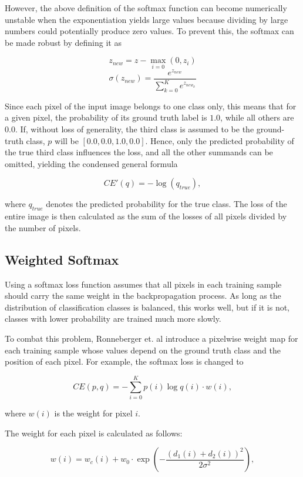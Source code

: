 However, the above definition of the softmax function can become numerically unstable when the exponentiation yields large values because dividing by large numbers could potentially produce zero values. To prevent this, the softmax can be made robust by defining it as

\[z_{new} = z - \max \limits_{i = 0}(0, z_i)\]
\[\sigma(z_{new}) = \frac{e^{z_{new}}}{\sum \limits_{k=0}^{K} e^{z_{new_{k}}}}\]

\noindent Since each pixel of the input image belongs to one class only, this means that for a given pixel, the probability of its ground truth label is $1.0$, while all others are $0.0$. If, without loss of generality, the third class is assumed to be the ground-truth class, $p$ will be $[0.0, 0.0, 1.0, 0.0]$.  Hence, only the predicted probability of the true third class influences the loss, and all the other summands can be omitted, yielding the condensed general formula

\[CE'(q) = - \log(q_{true}),\]

\noindent where $q_{true}$ denotes the predicted probability for the true class. The loss of the entire image is then calculated as the sum of the losses of all pixels divided by the number of pixels.



		\subsection{Weighted Softmax}

Using a softmax loss function assumes that all pixels in each training sample should carry the same weight in the backpropagation process. As long as the distribution of classification classes is balanced, this works well, but if it is not, classes with lower probability are trained much more slowly.

To combat this problem, Ronneberger et. al\cite{unet} introduce a pixelwise weight map for each training sample whose values depend on the ground truth class and the position of each pixel. For example, the softmax loss is changed to

\[CE(p, q) = -\sum \limits_{i = 0}^{K} p(i) \log q(i) \cdot w(i),\]

\noindent where $w(i)$ is the weight for pixel $i$.

 The weight for each pixel is calculated as follows:

\[ w(i) = w_c(i) + w_0 \cdot \exp \left (- \frac{(d_1(i) + d_2(i))^2}{2\sigma^2} \right ), \]

